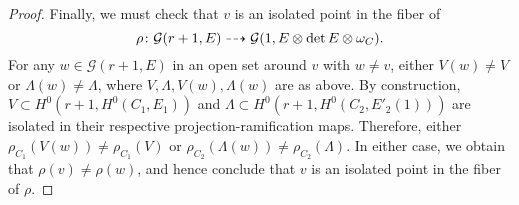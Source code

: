 \begin{proof}
  Finally, we must check that $v$ is an isolated point in the fiber of
  \[ \rho {\colon} \mathcal G(r+1, E) \dashrightarrow \mathcal G(1, E \otimes \det E \otimes \omega_C).\]
  For any $w \in \mathcal G(r+1, E)$ in an open set around $v$ with $w \neq v$, either $V(w) \neq V$ or $\Lambda(w) \neq \Lambda$, where $V, \Lambda, V(w), \Lambda(w)$ are as above.
  By construction, $V \subset H^0(r+1, H^0(C_1, E_1))$ and $\Lambda \subset H^0(r+1, H^0(C_2, E'_2(1)))$ are isolated in their respective projection-ramification maps.
  Therefore, either $\rho_{C_1} (V(w)) \neq \rho_{C_1}(V)$ or $\rho_{C_2}(\Lambda(w)) \neq \rho_{C_2}(\Lambda)$.
  In either case, we obtain that $\rho(v) \neq \rho(w)$, and hence conclude that $v$ is an isolated point in the fiber of $\rho$.
\end{proof}





